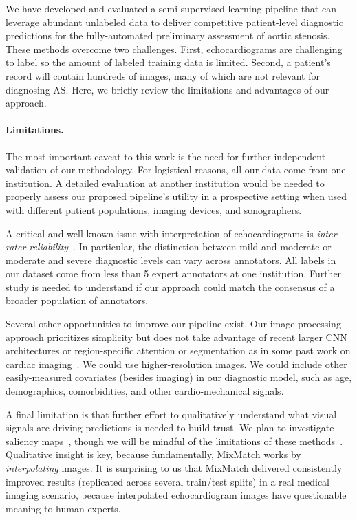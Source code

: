 We have developed and evaluated a semi-supervised learning pipeline that can leverage abundant unlabeled data to deliver competitive patient-level diagnostic predictions for the fully-automated preliminary assessment of aortic stenosis. These methods overcome two challenges. First, echocardiograms are challenging to label so the amount of labeled training data is limited. Second, a patient's record will contain hundreds of images, many of which are not relevant for diagnosing AS.
Here, we briefly review the limitations and advantages of our approach.

\paragraph{Limitations.} 
The most important caveat to this work is the need for further independent validation of our methodology.
For logistical reasons, all our data come from one institution.
A detailed evaluation at another institution would be needed to properly assess our proposed pipeline's utility in a prospective setting when used with different patient populations, imaging devices, and sonographers.

A critical and well-known issue with interpretation of echocardiograms is \emph{inter-rater reliability}~\citep{sacchiDopplerAssessmentAortic2018}.
In particular, the distinction between mild and moderate or moderate and severe diagnostic levels can vary across annotators.
All labels in our dataset come from less than 5 expert annotators at one institution.
Further study is needed to understand if our approach could match the consensus of a broader population of annotators.

Several other opportunities to improve our pipeline exist.
Our image processing approach prioritizes simplicity but does not take advantage of recent larger CNN architectures or region-specific attention or segmentation as in some past work on cardiac imaging~\citep{chenDeepLearningCardiac2020}. 
We could use higher-resolution images.
We could include other easily-measured covariates (besides imaging) in our diagnostic model, such as age, demographics, comorbidities, and other cardio-mechanical signals.

A final limitation is that further effort to qualitatively understand what visual signals are driving predictions is needed to build trust.
We plan to investigate saliency maps~\citep{simonyanDeepConvolutionalNetworks2014,selvarajuGradCAMVisualExplanations2020}, though we will be mindful of the limitations of these methods~\citep{adebayoSanityChecksSaliency2018}.
Qualitative insight is key, because fundamentally, MixMatch works by \emph{interpolating} images. It is surprising to us that MixMatch delivered consistently improved results (replicated across several train/test splits) in a real medical imaging scenario, because interpolated echocardiogram images have questionable meaning to human experts.

